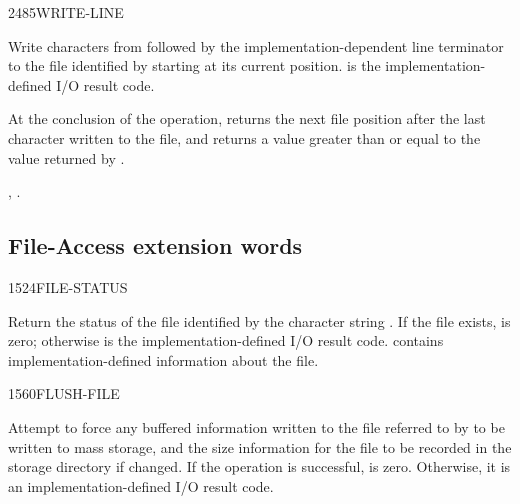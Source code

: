 \begin{worddef}{2485}{WRITE-LINE}
\item {}

	Write  characters from  followed by the
	implementation-dependent line terminator to the file identified
	by  starting at its current position.  is
	the implementation-defined I/O result code.

	At the conclusion of the operation,  returns
	the next file position after the last character written to the
	file, and  returns a value greater than or equal
	to the value returned by .

\see {},
	.
\end{worddef}


\subsection{File-Access extension words} %
\extended

\begin{worddef}{1524}{FILE-STATUS}
\item {}

	Return the status of the file identified by the character string
	. If the file exists,  is zero;
	otherwise  is the implementation-defined I/O result
	code.  contains implementation-defined information about
	the file.
\end{worddef}


\begin{worddef}{1560}{FLUSH-FILE}
\item {}

	Attempt to force any buffered information written to the file
	referred to by  to be written to mass storage, and
	the size information for the file to be recorded in the storage
	directory if changed. If the operation is successful, 
	is zero. Otherwise, it is an implementation-defined I/O result
	code.
\end{worddef}


